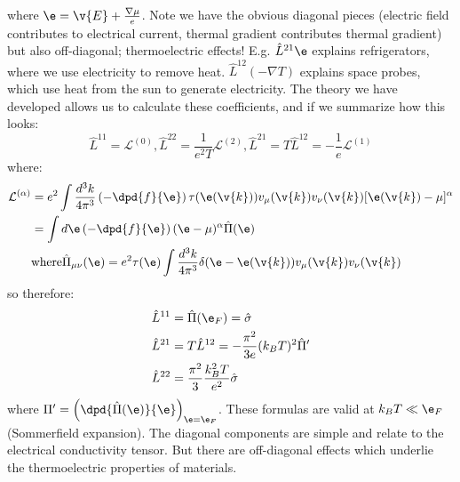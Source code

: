 where $\e = \v{E} + \frac{\nabla \mu}{e}$. Note we have the obvious diagonal pieces (electric field contributes to electrical current, thermal gradient contributes thermal gradient) but also off-diagonal; thermoelectric effects! E.g. $\hat{L}^{21}\e$ explains refrigerators, where we use electricity to remove heat. $\hat{L}^{12}(-\nabla T)$ explains space probes, which use heat from the sun to generate electricity. The theory we have developed allows us to calculate these coefficients, and if we summarize how this looks:
\begin{equation}
    \hat{L}^{11} = \mathcal{L}^{(0)}, \hat{L}^{22} = \frac{1}{e^2T}\mathcal{L}^{(2)}, \hat{L}^{21} = T\hat{L}^{12} = -\frac{1}{e}\mathcal{L}^{(1)}
\end{equation}
where:
\begin{equation}
    \begin{split}
        \mathcal{L}^{(\alpha)} &= e^2 \int \frac{d^3k}{4\pi^3}\left(-\dpd{f}{\e}\right)\tau(\e(\v{k}))v_\mu(\v{k})v_\nu(\v{k})[\e(\v{k}) - \mu]^\alpha
        \\ &= \int d\e \left(-\dpd{f}{\e}\right)(\e - \mu)^\alpha \hat{\Pi}(\e)
        \\ &\text{where} \hat{\Pi}_{\mu\nu}(\e) = e^2\tau(\e)\int \frac{d^3k}{4\pi^3}\delta(\e - \e(\v{k}))v_\mu(\v{k})v_\nu(\v{k})
    \end{split}
\end{equation}
so therefore:
\begin{equation}
    \begin{split}
        \hat{L}^{11} &= \hat{\Pi}(\e_F) = \hat{\sigma}
        \\ \hat{L}^{21} &= T\hat{L}^{12} = -\frac{\pi^2}{3e}(k_B T)^2 \hat{\Pi}'
        \\ \hat{L}^{22} &= \frac{\pi^2}{3}\frac{k_B^2 T}{e^2}\hat{\sigma}
    \end{split}
\end{equation}
where $\Pi' = \left(\dpd{\hat{\Pi}(\e)}{\e}\right)_{\e = \e_F}$. These formulas are valid at $k_B T \ll \e_F$ (Sommerfield expansion). The diagonal components are simple and relate to the electrical conductivity tensor. But there are off-diagonal effects which underlie the thermoelectric properties of materials.

